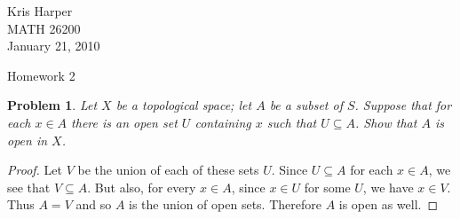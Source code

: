 \documentclass{article}
\newtheorem{problem}{Problem}
\begin{document}
\begin{flushright}
Kris Harper\\

MATH 26200\\

January 21, 2010
\end{flushright}

\begin{center}
Homework 2
\end{center}

\begin{problem}
Let $X$ be a topological space; let $A$ be a subset of $S$. Suppose that for each $x \in A$ there is an open set $U$ containing $x$ such that $U \subseteq A$. Show that $A$ is open in $X$.
\end{problem}
\begin{proof}
Let $V$ be the union of each of these sets $U$. Since $U \subseteq A$ for each $x \in A$, we see that $V \subseteq A$. But also, for every $x \in A$, since $x \in U$ for some $U$, we have $x \in V$. Thus $A = V$ and so $A$ is the union of open sets. Therefore $A$ is open as well.
\end{proof}
\end{document}
